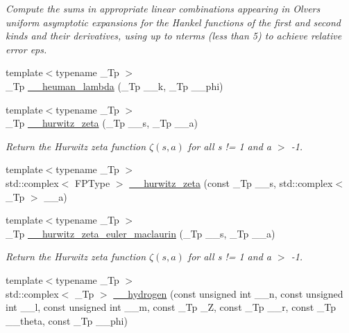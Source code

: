 \begin{DoxyCompactItemize}
\begin{DoxyCompactList}\small\item\em Compute the sums in appropriate linear combinations appearing in Olver\textquotesingle{}s uniform asymptotic expansions for the Hankel functions of the first and second kinds and their derivatives, using up to nterms (less than 5) to achieve relative error {\ttfamily eps}. \end{DoxyCompactList}\item 
{\footnotesize template$<$typename \+\_\+\+Tp $>$ }\\\+\_\+\+Tp \hyperlink{namespacestd_1_1____detail_a90938823a16cabc06031ebf209066a94}{\+\_\+\+\_\+heuman\+\_\+lambda} (\+\_\+\+Tp \+\_\+\+\_\+k, \+\_\+\+Tp \+\_\+\+\_\+phi)
\item 
{\footnotesize template$<$typename \+\_\+\+Tp $>$ }\\\+\_\+\+Tp \hyperlink{namespacestd_1_1____detail_a63aafed798ada71b2cc58e84a6652169}{\+\_\+\+\_\+hurwitz\+\_\+zeta} (\+\_\+\+Tp \+\_\+\+\_\+s, \+\_\+\+Tp \+\_\+\+\_\+a)
\begin{DoxyCompactList}\small\item\em Return the Hurwitz zeta function $ \zeta(s,a) $ for all s != 1 and a $>$ -\/1. \end{DoxyCompactList}\item 
{\footnotesize template$<$typename \+\_\+\+Tp $>$ }\\std\+::complex$<$ F\+P\+Type $>$ \hyperlink{namespacestd_1_1____detail_a8381d5cd047b45387ab2d0ef3591171c}{\+\_\+\+\_\+hurwitz\+\_\+zeta} (const \+\_\+\+Tp \+\_\+\+\_\+s, std\+::complex$<$ \+\_\+\+Tp $>$ \+\_\+\+\_\+a)
\item 
{\footnotesize template$<$typename \+\_\+\+Tp $>$ }\\\+\_\+\+Tp \hyperlink{namespacestd_1_1____detail_a56c55858723fe9e0c541f0e77572b58d}{\+\_\+\+\_\+hurwitz\+\_\+zeta\+\_\+euler\+\_\+maclaurin} (\+\_\+\+Tp \+\_\+\+\_\+s, \+\_\+\+Tp \+\_\+\+\_\+a)
\begin{DoxyCompactList}\small\item\em Return the Hurwitz zeta function $ \zeta(s,a) $ for all s != 1 and a $>$ -\/1. \end{DoxyCompactList}\item 
{\footnotesize template$<$typename \+\_\+\+Tp $>$ }\\std\+::complex$<$ \+\_\+\+Tp $>$ \hyperlink{namespacestd_1_1____detail_af8bd1ad6980e19dce3ee9eb518bc90fa}{\+\_\+\+\_\+hydrogen} (const unsigned int \+\_\+\+\_\+n, const unsigned int \+\_\+\+\_\+l, const unsigned int \+\_\+\+\_\+m, const \+\_\+\+Tp \+\_\+\+Z, const \+\_\+\+Tp \+\_\+\+\_\+r, const \+\_\+\+Tp \+\_\+\+\_\+theta, const \+\_\+\+Tp \+\_\+\+\_\+phi)

\end{DoxyCompactItemize}
